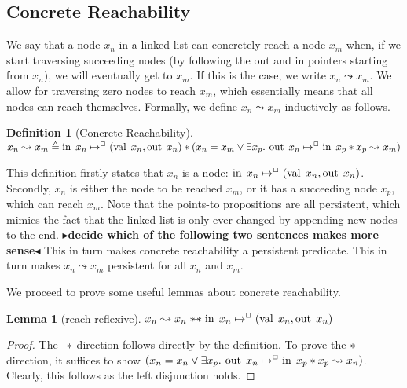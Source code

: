 \documentclass[a4paper, 11pt]{report}
\newtheorem{lemma}[theorem]{Lemma}
\newtheorem{definition}{Definition}[section]
\newcommand{\nIn}[1]{\operatorname{in} \; #1}
\newcommand{\nVal}[1]{\operatorname{val} \; #1}
\newcommand{\nOut}[1]{\operatorname{out} \; #1}
\newcommand{\isNode}[1]{\nIn{#1} \mapsto^{\persistently} (\nVal{#1}, \nOut{#1})}
\newcommand{\reach}[2]{#1 \leadsto #2}
\newcommand{\todo}[1]{{\color[rgb]{.5,0,0}\textbf{$\blacktriangleright$#1$\blacktriangleleft$}}}
\begin{document}
\subsection{Concrete Reachability}
We say that a node $x_n$ in a linked list can concretely reach a node $x_m$ when, if we start traversing succeeding nodes (by following the out and in pointers starting from $x_n$), we will eventually get to $x_m$. If this is the case, we write $\reach{x_n}{x_m}$. We allow for traversing zero nodes to reach $x_m$, which essentially means that all nodes can reach themselves. Formally, we define $\reach{x_n}{x_m}$ inductively as follows.
\begin{definition}[Concrete Reachability]
  $\reach{x_n}{x_m} \eqdef \nIn{x_n} \mapsto^{\persistently} (\nVal{x_n}, \nOut{x_n}) \star (x_n = x_m \lor \Exists x_p . \nOut{x_n} \mapsto^{\persistently} \nIn{x_p} \star \reach{x_p}{x_m})$
\end{definition}
This definition firstly states that $x_n$ is a node: $\nIn{x_n} \mapsto^{\persistently} (\nVal{x_n}, \nOut{x_n})$. Secondly, $x_n$ is either the node 
to be reached $x_m$, or it has a succeeding node $x_p$, which can reach $x_m$.
Note that the points-to propositions are all persistent, which mimics the fact that the linked list is only ever changed by appending new nodes to the end.
\todo{decide which of the following two sentences makes more sense}
This in turn makes concrete reachability a persistent predicate.
This in turn makes $\reach{x_n}{x_m}$ persistent for all $x_n$ and $x_m$.

We proceed to prove some useful lemmas about concrete reachability.
\begin{lemma}[reach-reflexive]\label{lemma:reach-reflexive}
  $\reach{x_n}{x_n} \wandIff \isNode{x_n}$
\end{lemma}
\begin{proof}
  The $\mathrel{-\!\!*}$ direction follows directly by the definition. To prove the $\mathrel{*\!\!-}$ direction, it suffices to show $(x_n = x_n \lor \Exists x_p . \nOut{x_n} \mapsto^{\persistently} \nIn{x_p} \star \reach{x_p}{x_n})$. Clearly, this follows as the left disjunction holds.
\end{proof}
\end{document}
